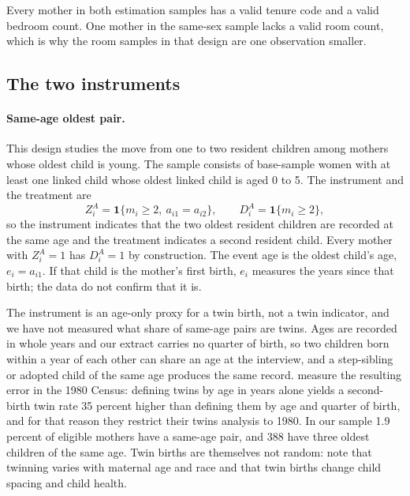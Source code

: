 Every mother in both estimation samples has a valid tenure code and a valid bedroom
count. One mother in the same-sex sample lacks a valid room count, which is why the
room samples in that design are one observation smaller.

\subsection{The two instruments}
\label{app:acs_iv_instruments}

\paragraph{Same-age oldest pair.}
This design studies the move from one to two resident children among mothers whose
oldest child is young. The sample consists of base-sample women with at least one
linked child whose oldest linked child is aged 0 to 5. The instrument and the
treatment are
\begin{equation}
Z_i^{A}=\mathbf{1}\{m_i\ge 2,\ a_{i1}=a_{i2}\},
\qquad
D_i^{A}=\mathbf{1}\{m_i\ge 2\},
\label{eq:acsiv_twin_def}
\end{equation}
so the instrument indicates that the two oldest resident children are recorded at
the same age and the treatment indicates a second resident child. Every mother with
$Z_i^{A}=1$ has $D_i^{A}=1$ by construction. The event age is the oldest child's
age, $e_i=a_{i1}$. If that child is the mother's first birth, $e_i$ measures the
years since that birth; the data do not confirm that it is.

The instrument is an age-only proxy for a twin birth, not a twin indicator, and we
have not measured what share of same-age pairs are twins. Ages are recorded in whole
years and our extract carries no quarter of birth, so two children born within a
year of each other can share an age at the interview, and a step-sibling or adopted
child of the same age produces the same record. \citet[p.~454]{angrist1998children}
measure the resulting error in the 1980 Census: defining twins by age in years
alone yields a second-birth twin rate 35 percent higher than defining them by age
and quarter of birth, and for that reason they restrict their twins analysis to
1980. In our sample 1.9 percent of eligible mothers have a same-age pair, and 388
have three oldest children of the same age. Twin births are themselves not
random: \citet[p.~775]{angrist2010multiple} note that twinning varies with maternal
age and race and that twin births change child spacing and child health.

